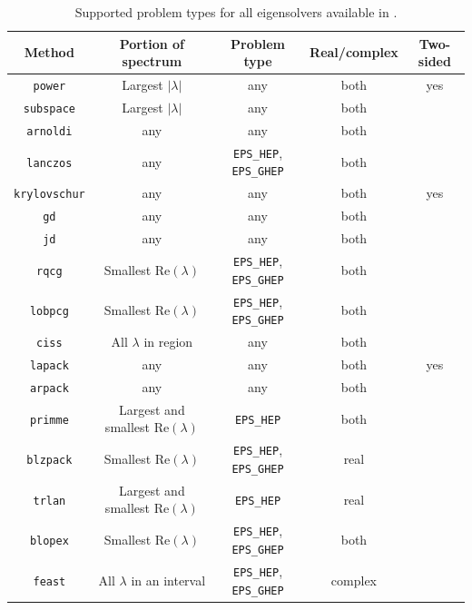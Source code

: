 \begin{table}
\centering
\begin{tabular}{ccccc} \hline
Method   &  Portion of spectrum & Problem type & \!Real/complex\! & \!Two-sided\!\\ \hline
\texttt{power}       & Largest $|\lambda|$ & any & both & yes\\
\texttt{subspace}    & Largest $|\lambda|$ & any & both & \\
\texttt{arnoldi}     & any    & any & both & \\
\texttt{lanczos}     & any    & \Verb!EPS_HEP!, \Verb!EPS_GHEP! & both & \\
\!\texttt{krylovschur}\! & any    & any & both & yes \\
\texttt{gd}          & any    & any & both & \\
\texttt{jd}          & any    & any & both & \\
\texttt{rqcg}        & Smallest $\mathrm{Re}(\lambda)$ & \Verb!EPS_HEP!, \Verb!EPS_GHEP! & both & \\
\texttt{lobpcg}      & Smallest $\mathrm{Re}(\lambda)$ & \Verb!EPS_HEP!, \Verb!EPS_GHEP! & both & \\
\texttt{ciss}        & All $\lambda$ in region & any & both & \\
\hline
\texttt{lapack}      & any    & any & both & yes \\
\texttt{arpack}      & any    & any & both & \\
\texttt{primme}      & Largest and smallest $\mathrm{Re}(\lambda)$ & \Verb!EPS_HEP! & both & \\
\texttt{blzpack}     & Smallest $\mathrm{Re}(\lambda)$ & \Verb!EPS_HEP!, \Verb!EPS_GHEP!& real & \\
\texttt{trlan}       & Largest and smallest $\mathrm{Re}(\lambda)$ & \Verb!EPS_HEP! & real & \\
\texttt{blopex}      & Smallest $\mathrm{Re}(\lambda)$ & \Verb!EPS_HEP!, \Verb!EPS_GHEP! & both & \\
\texttt{feast}       & All $\lambda$ in an interval & \Verb!EPS_HEP!, \Verb!EPS_GHEP! & complex & \\ \hline
\end{tabular}
\caption{\label{tab:support}Supported problem types for all eigensolvers available in \slepc.}
\end{table}


